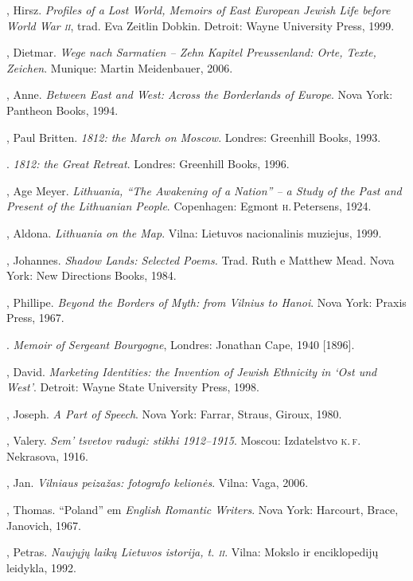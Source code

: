 \begin{bibliohedra}
 , Hirsz. \textit{Profiles of a Lost World, Memoirs of East
  European Jewish Life before World War \textsc{ii}}, trad. Eva Zeitlin Dobkin. Detroit: Wayne University
  Press, 1999.

  , Dietmar. \textit{Wege nach Sarmatien -- Zehn Kapitel
  Preussenland: Orte, Texte, Zeichen}. Munique: Martin Meidenbauer,
  2006.

  , Anne. \textit{Between East and West: Across the Borderlands
  of Europe}. Nova York: Pantheon Books, 1994.

  , Paul Britten. \textit{1812: the March on Moscow}. Londres:
  Greenhill Books, 1993.

  \titidem. \textit{1812: the Great Retreat}. Londres:
  Greenhill Books, 1996.

  , Age Meyer. \textit{Lithuania, ``The Awakening of a Nation''
  -- a Study of the Past and Present of the Lithuanian People}.
  Copenhagen: Egmont \textsc{h}.\,Petersens, 1924.

  , Aldona. \textit{Lithuania on the Map}. Vilna:
  Lietuvos nacionalinis muziejus, 1999.

  , Johannes. \textit{Shadow Lands: Selected Poems.} Trad. Ruth e
  Matthew Mead. Nova York: New Directions Books, 1984.

  , Phillipe. \textit{Beyond the Borders of Myth: from Vilnius to
  Hanoi}. Nova York: Praxis Press, 1967.

  . \textit{Memoir of Sergeant Bourgogne}, Londres: Jonathan Cape,
  1940 {[}1896{]}.

  , David. \textit{Marketing Identities: the Invention of Jewish
  Ethnicity in `Ost und West'}. Detroit: Wayne State University Press,
  1998.

  , Joseph. \textit{A Part of Speech}. Nova York: Farrar, Straus,
  Giroux, 1980.

  , Valery. \textit{Sem' tsvetov radugi: stikhi 1912--1915}. Moscou:
  Izdatelstvo \textsc{k.\,f.}\,Nekrasova, 1916.

  , Jan. \textit{Vilniaus peizažas: fotografo kelionės}. Vilna:
  Vaga, 2006.

  , Thomas. ``Poland'' em \textit{English Romantic Writers}. Nova York: Harcourt, Brace, Janovich, 1967.

  , Petras. \textit{Naujųjų laikų Lietuvos istorija, t. \textsc{ii}}.
  Vilna: Mokslo ir enciklopedijų leidykla, 1992.


\end{bibliohedra}
